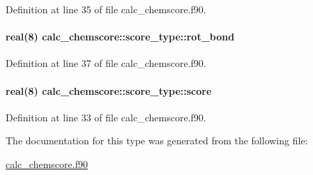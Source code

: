 Definition at line 35 of file calc\-\_\-chemscore.\-f90.

\hypertarget{structcalc__chemscore_1_1score__type_a06b967473b197c05a0a3d25d5b864e50}{
\paragraph[{rot\-\_\-bond}]{\setlength{\rightskip}{0pt plus 5cm}real(8) calc\-\_\-chemscore\-::score\-\_\-type\-::rot\-\_\-bond}}\label{structcalc__chemscore_1_1score__type_a06b967473b197c05a0a3d25d5b864e50}


Definition at line 37 of file calc\-\_\-chemscore.\-f90.

\hypertarget{structcalc__chemscore_1_1score__type_ab653acb22618b073d6f5912c97ea6109}{
\paragraph[{score}]{\setlength{\rightskip}{0pt plus 5cm}real(8) calc\-\_\-chemscore\-::score\-\_\-type\-::score}}\label{structcalc__chemscore_1_1score__type_ab653acb22618b073d6f5912c97ea6109}


Definition at line 33 of file calc\-\_\-chemscore.\-f90.



The documentation for this type was generated from the following file\-:\begin{DoxyCompactItemize}
\item 
\hyperlink{calc__chemscore_8f90}{calc\-\_\-chemscore.\-f90}\end{DoxyCompactItemize}
